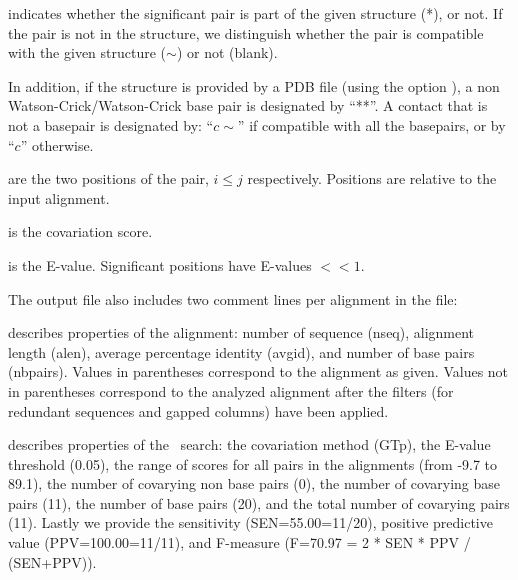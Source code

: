 \begin{sreitems}{}
 \item[\prog{First column}] indicates whether the significant pair is
   part of the given structure (*), or not.  If the pair is not in the
   structure, we distinguish whether the pair is compatible with the
   given structure ($\sim$) or not (blank).

  In addition, if the structure is provided by a PDB file (using the
  option ), a non Watson-Crick/Watson-Crick base pair
  is designated by ``**''. A contact that is not a basepair is
  designated by: ``$c\sim$'' if compatible with all the basepairs, or
  by ``$c$'' otherwise.

 \item[\prog{Second and third columns}] are the two positions of the
   pair, $i\leq j$ respectively. Positions are relative to the input
   alignment.

 \item[\prog{Fourth column}] is the covariation score.

 \item[\prog{Fifth column}] is the E-value. Significant positions
   have E-values $<< 1$.
 \end{sreitems}
 The output file also includes two comment lines per alignment in the
 file:

 \begin{sreitems}{} \item[\prog{First
 comment line}]describes properties of the alignment: number of
 sequence (nseq), alignment length (alen), average percentage identity
 (avgid), and number of base pairs (nbpairs).  Values in parentheses
 correspond to the alignment as given. Values not in parentheses
 correspond to the analyzed alignment after the filters (for redundant
 sequences and gapped columns) have been applied.

 \item[\prog{Second comment line}]describes properties of the \rscape\
   search: the covariation method (GTp), the E-value threshold (0.05),
   the range of scores for all pairs in the alignments (from -9.7 to
   89.1), the number of covarying non base pairs (0), the number of
   covarying base pairs (11), the number of base pairs (20), and the
   total number of covarying pairs (11). Lastly we provide the
   sensitivity (SEN=55.00=11/20), positive predictive value
   (PPV=100.00=11/11), and F-measure (F=70.97 = 2 * SEN * PPV /
   (SEN+PPV)).  \end{sreitems}


